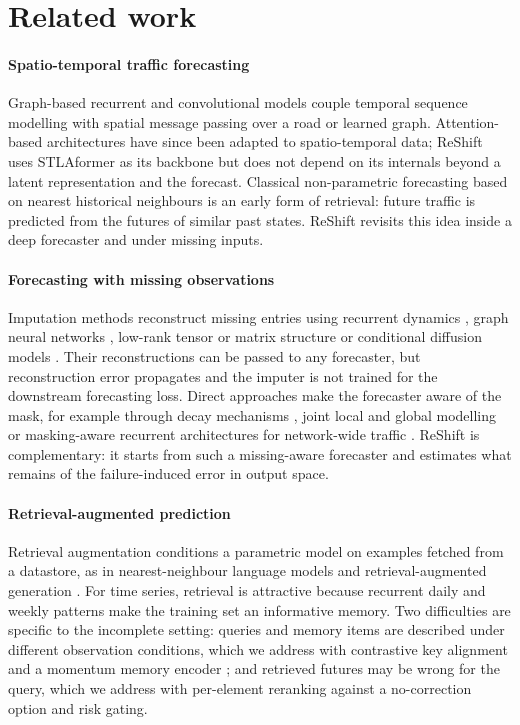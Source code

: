 \section{Related work}
\label{sec:related}

\paragraph{Spatio-temporal traffic forecasting}
Graph-based recurrent and convolutional models \citep{li2018dcrnn,yu2018stgcn,wu2019graphwavenet,bai2020agcrn} couple temporal sequence modelling with spatial message passing over a road or learned graph. Attention-based architectures \citep{vaswani2017attention} have since been adapted to spatio-temporal data; ReShift uses STLAformer \citep{stlaformer} as its backbone but does not depend on its internals beyond a latent representation and the forecast. Classical non-parametric forecasting based on nearest historical neighbours \citep{davis1991nonparametric,smith1997traffic} is an early form of retrieval: future traffic is predicted from the futures of similar past states. ReShift revisits this idea inside a deep forecaster and under missing inputs.

\paragraph{Forecasting with missing observations}
Imputation methods reconstruct missing entries using recurrent dynamics \citep{che2018grud,cao2018brits}, graph neural networks \citep{cini2022grin}, low-rank tensor or matrix structure \citep{chen2019bayesian} or conditional diffusion models \citep{tashiro2021csdi}. Their reconstructions can be passed to any forecaster, but reconstruction error propagates and the imputer is not trained for the downstream forecasting loss. Direct approaches make the forecaster aware of the mask, for example through decay mechanisms \citep{che2018grud}, joint local and global modelling \citep{tang2020joint} or masking-aware recurrent architectures for network-wide traffic \citep{cui2020missing}. ReShift is complementary: it starts from such a missing-aware forecaster and estimates what remains of the failure-induced error in output space.

\paragraph{Retrieval-augmented prediction}
Retrieval augmentation conditions a parametric model on examples fetched from a datastore, as in nearest-neighbour language models \citep{khandelwal2020knnlm} and retrieval-augmented generation \citep{lewis2020rag}. For time series, retrieval is attractive because recurrent daily and weekly patterns make the training set an informative memory. Two difficulties are specific to the incomplete setting: queries and memory items are described under different observation conditions, which we address with contrastive key alignment \citep{oord2018cpc} and a momentum memory encoder \citep{he2020moco}; and retrieved futures may be wrong for the query, which we address with per-element reranking against a no-correction option and risk gating.

